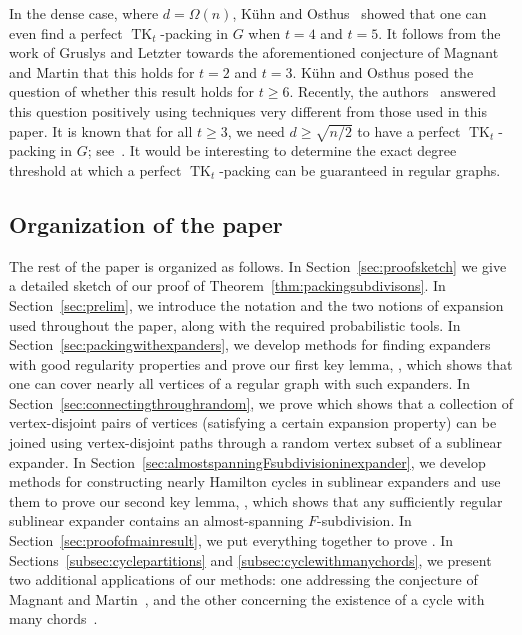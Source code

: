 \documentclass[10pt]{article}
\theoremstyle{plain}
\numberwithin{theorem}{section}
\theoremstyle{definition}
\theoremstyle{remark}
\DeclareMathOperator{\TK}{TK}
\theoremstyle{plain}
\begin{document}
In the dense case, where $d = \Omega(n)$, K\"uhn and Osthus~\cite{kuhn2005packings} showed that one can even find a perfect $\TK_t$-packing in $G$ when $t = 4$ and $t = 5$. It follows from the work of Gruslys and Letzter \cite{gruslys2021cycle} towards the aforementioned conjecture of Magnant and Martin \cite{magnant2009note} that this holds for $t = 2$ and $t = 3$. K\"uhn and Osthus posed the question of whether this result holds for $t \ge 6$.  Recently, the authors~\cite{LetzterMetukuSudakovdense} answered this question positively using techniques very different from those used in this paper.  It is known that for all $t \ge 3$, we need $d \ge \sqrt{n/2}$ to have a perfect $\TK_t$-packing in $G$; see~\cite{kuhn2005packings}. It would be interesting to determine the exact degree threshold at which a perfect $\TK_t$-packing can be guaranteed in regular graphs.


\subsection{Organization of the paper} 

The rest of the paper is organized as follows. In Section~\ref{sec:proofsketch} we give a detailed sketch of our proof of Theorem~\ref{thm:packingsubdivisons}. In Section~\ref{sec:prelim}, we introduce the notation and the two notions of expansion used throughout the paper, along with the required probabilistic tools. In Section~\ref{sec:packingwithexpanders}, we develop methods for finding expanders with good regularity properties and prove our first key lemma, , which shows that one can cover nearly all vertices of a regular graph with such expanders. In Section~\ref{sec:connectingthroughrandom}, we prove  which shows that a collection of vertex-disjoint pairs of vertices (satisfying a certain expansion property) can be joined using vertex-disjoint paths through a random vertex subset of a sublinear expander. In Section~\ref{sec:almostspanningFsubdivisioninexpander}, we develop methods for constructing nearly Hamilton cycles in sublinear expanders and use them to prove our second key lemma, , which shows that any sufficiently regular sublinear expander contains an almost-spanning $F$-subdivision. In Section~\ref{sec:proofofmainresult}, we put everything together to prove . In Sections~\ref{subsec:cyclepartitions} and \ref{subsec:cyclewithmanychords}, we present two additional applications of our methods: one addressing the conjecture of Magnant and Martin~\cite{magnant2009note}, and the other concerning the existence of a cycle with many chords~\cite{chen1996proof}. 
\end{document}
